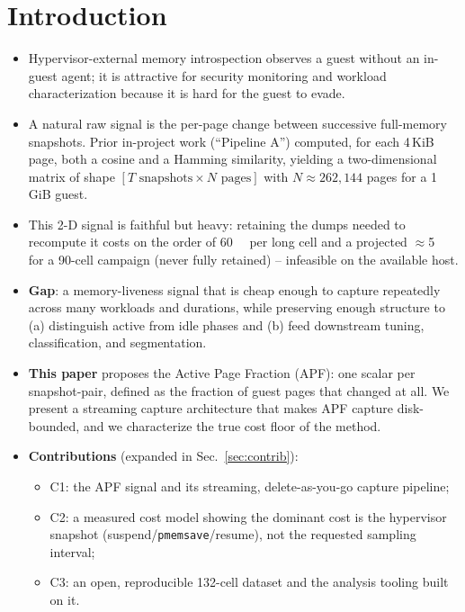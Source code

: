 \documentclass[conference]{IEEEtran}
\begin{document}
\section{Introduction}
\begin{itemize}
  \item Hypervisor-external memory introspection observes a guest without an
        in-guest agent; it is attractive for security monitoring and workload
        characterization because it is hard for the guest to evade.
  \item A natural raw signal is the per-page change between successive
        full-memory snapshots. Prior in-project work (``Pipeline A'') computed,
        for each 4\,KiB page, both a cosine and a Hamming similarity, yielding a
        two-dimensional matrix of shape $[T \text{ snapshots} \times N \text{ pages}]$
        with $N \approx 262{,}144$ pages for a 1\,GiB guest.
  \item This 2-D signal is faithful but heavy: retaining the dumps needed to
        recompute it costs on the order of \SI{60}{\gibi\byte} per long cell and
        a projected $\approx$\SI{5}{\tebi\byte} for a 90-cell campaign (never
        fully retained) -- infeasible on the available host.
  \item \textbf{Gap}: a memory-liveness signal that is cheap enough to capture
        repeatedly across many workloads and durations, while preserving enough
        structure to (a) distinguish active from idle phases and (b) feed
        downstream tuning, classification, and segmentation.
  \item \textbf{This paper} proposes the Active Page Fraction (APF): one scalar
        per snapshot-pair, defined as the fraction of guest pages that changed
        at all. We present a streaming capture architecture that makes APF
        capture disk-bounded, and we characterize the true cost floor of the
        method.
  \item \textbf{Contributions} (expanded in Sec.~\ref{sec:contrib}):
    \begin{itemize}
      \item C1: the APF signal and its streaming, delete-as-you-go capture
            pipeline;
      \item C2: a measured cost model showing the dominant cost is the
            hypervisor snapshot (suspend/\texttt{pmemsave}/resume), not the
            requested sampling interval;
      \item C3: an open, reproducible 132-cell dataset and the analysis tooling
            built on it.
    \end{itemize}
\end{itemize}
\end{document}
